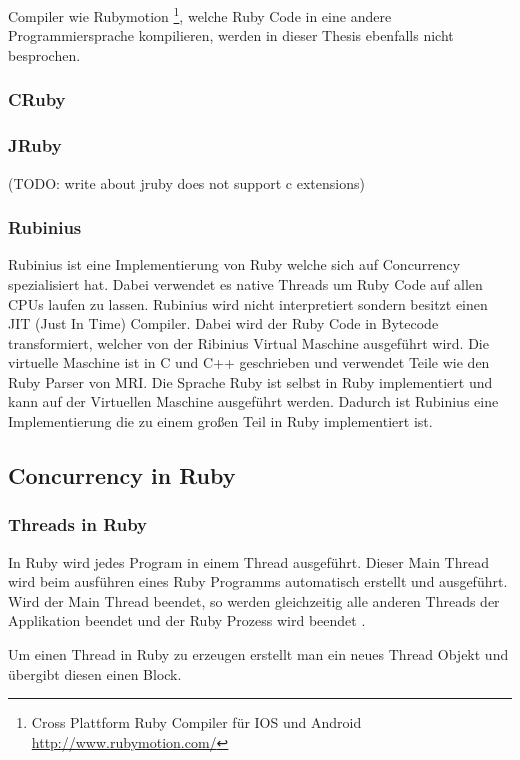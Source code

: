 Compiler wie Rubymotion \footnote{Cross Plattform Ruby Compiler für IOS und Android \url{http://www.rubymotion.com/}}, welche Ruby Code in eine andere Programmiersprache kompilieren, werden in dieser Thesis ebenfalls nicht besprochen.

\subsubsection{CRuby}


\subsubsection{JRuby}

(TODO: write about jruby does not support c extensions)


\subsubsection{Rubinius}
Rubinius ist eine Implementierung von Ruby welche sich auf Concurrency spezialisiert hat. Dabei verwendet es native Threads um Ruby Code auf allen CPUs laufen zu lassen. Rubinius wird nicht interpretiert sondern besitzt einen JIT (Just In Time) Compiler. Dabei wird der Ruby Code in Bytecode transformiert, welcher von der Ribinius Virtual Maschine ausgeführt wird. Die virtuelle Maschine ist in C und C++ geschrieben und verwendet Teile wie den Ruby Parser von MRI. Die Sprache Ruby ist selbst in Ruby implementiert und kann auf der Virtuellen Maschine ausgeführt werden. Dadurch ist Rubinius eine Implementierung die zu einem großen Teil in Ruby implementiert ist. 





\subsection{Concurrency in Ruby}

\subsubsection{Threads in Ruby}
In Ruby wird jedes Program in einem Thread ausgeführt. Dieser Main Thread wird beim ausführen eines Ruby Programms automatisch erstellt und ausgeführt. Wird der Main Thread beendet, so werden gleichzeitig alle anderen Threads der Applikation beendet und der Ruby Prozess wird beendet \cite[p. 15]{Sto2013}.

Um einen Thread in Ruby zu erzeugen erstellt man ein neues Thread Objekt und übergibt diesen einen Block. 

